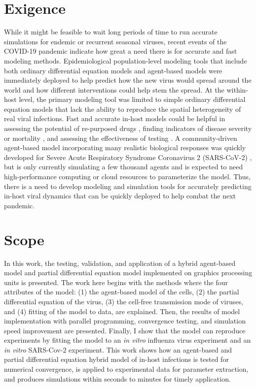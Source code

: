 \section{Exigence}
While it might be feasible to wait long periods of time to run accurate simulations for endemic or recurrent seasonal viruses, recent events of the COVID-19 pandemic indicate how great a need there is for accurate and fast modeling methods. Epidemiological population-level modeling tools that include both ordinary differential equation models \citep{li20,ngonghala20} and agent-based models \citep{ying21,sneppen21,kano21} were immediately deployed to help predict how the new virus would spread around the world and how different interventions could help stem the spread. At the within-host level, the primary modeling tool was limited to simple ordinary differential equation models \citep{goncalves20,wang20model,hernandez20,dogra20} that lack the ability to reproduce the spatial heterogeneity of real viral infections. Fast and accurate in-host models could be helpful in assessing the potential of re-purposed drugs \citep{czuppon21,goncalves20,dodds20}, finding indicators of disease severity or mortality \citep{neant21}, and assessing the effectiveness of testing \citep{ejima21}. A community-driven agent-based model incorporating many realistic biological responses was quickly developed for Severe Acute Respiratory Syndrome Coronavirus 2 (SARS-CoV-2) \citep{getz21}, but is only currently simulating a few thousand agents and is expected to need high-performance computing or cloud resources to parameterize the model. Thus, there is a need to develop modeling and simulation tools for accurately predicting in-host viral dynamics that can be quickly deployed to help combat the next pandemic.

\section{Scope}

In this work, the testing, validation, and application of a hybrid agent-based model and partial differential equation model implemented on graphics processing units is presented. The work here begins with the methods where the four attributes of the model: (1) the agent-based model of the cells, (2) the partial differential equation of the virus, (3) the cell-free transmission mode of viruses, and (4) fitting of the model to data, are explained.  Then, the results of model implementation with parallel programming, convergence testing, and simulation speed improvement are presented. Finally, I show that the model can reproduce experiments by fitting the model to an \emph{in vitro} influenza virus experiment and an \emph{in vitro} SARS-Cov-2 experiment. This work shows how an agent-based and partial differential equation hybrid model of in-host infections is tested for numerical convergence, is applied to experimental data for parameter extraction, and produces simulations within seconds to minutes for timely application. 




